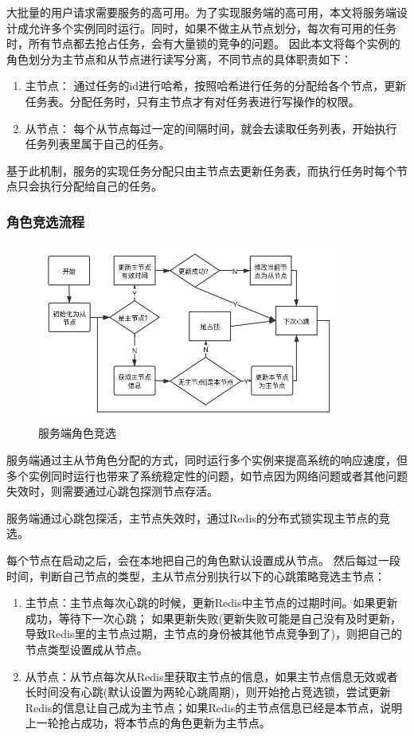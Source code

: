 大批量的用户请求需要服务的高可用。为了实现服务端的高可用，本文将服务端设计成允许多个实例同时运行。同时，如果不做主从节点划分，每次有可用的任务时，所有节点都去抢占任务，会有大量锁的竞争的问题。
因此本文将每个实例的角色划分为主节点和从节点进行读写分离，不同节点的具体职责如下：
\begin{enumerate}
    \item 主节点： 通过任务的id进行哈希，按照哈希进行任务的分配给各个节点，更新任务表。分配任务时，只有主节点才有对任务表进行写操作的权限。

    \item 从节点： 每个从节点每过一定的间隔时间，就会去读取任务列表，开始执行任务列表里属于自己的任务。  

\end{enumerate}

基于此机制，服务的实现任务分配只由主节点去更新任务表，而执行任务时每个节点只会执行分配给自己的任务。

\subsubsection{角色竞选流程}

\begin{figure}
    \centering
    \includegraphics[width=10cm]{images/slave-master.png}
    \caption{服务端角色竞选}
    \label{fig:slave_master}
\end{figure}

服务端通过主从节角色分配的方式，同时运行多个实例来提高系统的响应速度，但多个实例同时运行也带来了系统稳定性的问题，如节点因为网络问题或者其他问题失效时，则需要通过心跳包探测节点存活。

服务端通过心跳包探活，主节点失效时，通过Redis的分布式锁实现主节点的竞选。

每个节点在启动之后，会在本地把自己的角色默认设置成从节点。
然后每过一段时间，判断自己节点的类型，主从节点分别执行以下的心跳策略竞选主节点：
\begin{enumerate}
    \item 主节点：主节点每次心跳的时候，更新Redis中主节点的过期时间。如果更新成功，等待下一次心跳； 如果更新失败(更新失败可能是自己没有及时更新，导致Redis里的主节点过期，主节点的身份被其他节点竞争到了)，则把自己的节点类型设置成从节点。
    
    \item 从节点：从节点每次从Redis里获取主节点的信息，如果主节点信息无效或者长时间没有心跳(默认设置为两轮心跳周期)，则开始抢占竞选锁，尝试更新Redis的信息让自己成为主节点；如果Redis的主节点信息已经是本节点，说明上一轮抢占成功，将本节点的角色更新为主节点。 
\end{enumerate}


